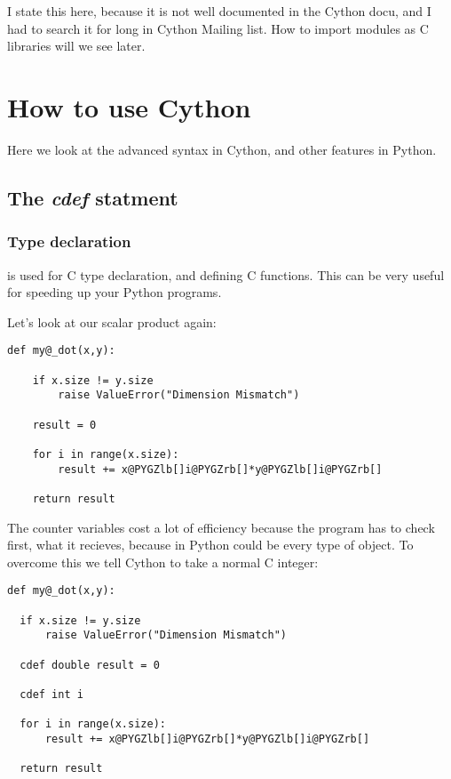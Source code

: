 \documentclass[letterpaper,10pt,english]{manual}
\begin{document}
I state this here, because it is not well documented in
the Cython docu, and I had to search it for long in Cython Mailing
list. How to import modules as C libraries will we see later.


\section{How to use Cython}

Here we look at the advanced syntax in Cython, and other features in Python.


\subsection{The \emph{cdef} statment}


\subsubsection{Type declaration}

 is used for C type declaration, and defining C functions.
This can be very useful for speeding up your Python programs.

Let's look at our scalar product again:

\begin{Verbatim}[commandchars=@\[\]]
def my@_dot(x,y):

    if x.size != y.size
        raise ValueError("Dimension Mismatch")

    result = 0

    for i in range(x.size):
        result += x@PYGZlb[]i@PYGZrb[]*y@PYGZlb[]i@PYGZrb[]

    return result
\end{Verbatim}

The counter variables cost a lot of efficiency because the program has
to check first, what it recieves, because in Python  could be
every type of object. To overcome this we tell Cython to take a normal
C integer:

\begin{Verbatim}[commandchars=@\[\]]
def my@_dot(x,y):

  if x.size != y.size
      raise ValueError("Dimension Mismatch")

  cdef double result = 0

  cdef int i

  for i in range(x.size):
      result += x@PYGZlb[]i@PYGZrb[]*y@PYGZlb[]i@PYGZrb[]

  return result
\end{Verbatim}
\end{document}
